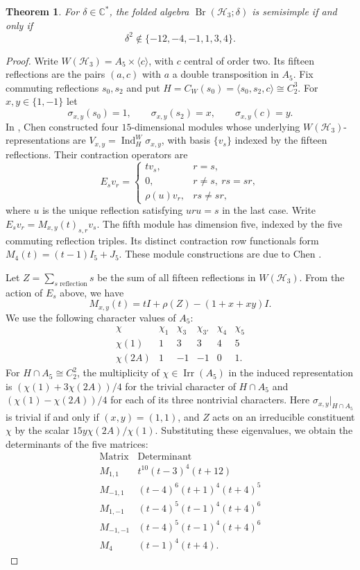 \documentclass[11pt,a4paper]{amsart}
\newcommand{\C}{\mathbb C}\newcommand{\Q}{\mathbb Q}\newcommand{\Z}{\mathbb Z}
\newcommand{\Br}{\operatorname{Br}}\newcommand{\Irr}{\operatorname{Irr}}
\newcommand{\Ind}{\operatorname{Ind}}\newcommand{\Res}{\operatorname{Res}}
\newtheorem{theorem}{Theorem}[section]
\theoremstyle{uprightdefinition}
\theoremstyle{remark}\newtheorem{remark}[theorem]{Remark}
\begin{document}
\begin{theorem}\label{thm:app-h3}
For $\delta\in\C^*$, the folded algebra $\Br(\mathscr{H}_3;\delta)$ is
semisimple if and only if
\[
 \delta^2\notin\{-12,-4,-1,1,3,4\}.
\]
\end{theorem}
\begin{proof}
Write $W(\mathscr{H}_3)=A_5\times\langle c\rangle$, with $c$ central of order
two. Its fifteen reflections are the pairs $(a,c)$ with $a$ a double
transposition in $A_5$. Fix commuting reflections $s_0,s_2$ and put
$H=C_W(s_0)=\langle s_0,s_2,c\rangle\cong C_2^3$.
For $x,y\in\{1,-1\}$ let
\[
 \sigma_{x,y}(s_0)=1,\qquad
 \sigma_{x,y}(s_2)=x,\qquad \sigma_{x,y}(c)=y.
\]
In \cite[Section~7]{Chen2012}, Chen constructed four $15$-dimensional modules whose underlying $W(\mathscr{H}_3)$-representations are
$V_{x,y}=\Ind_H^W\sigma_{x,y}$, with basis $\{v_s\}$
indexed by the fifteen reflections. Their contraction operators are
\[
 E_sv_r=\begin{cases}
 t v_s,&r=s,\\
 0,&r\ne s,\ rs=sr,\\
 \rho(u)v_r,&rs\ne sr,
 \end{cases}
\]
where $u$ is the unique reflection satisfying $uru=s$ in the last case.
Write $E_sv_r=M_{x,y}(t)_{s,r}v_s$.
The fifth module has dimension five, indexed by the five commuting
reflection triples. Its distinct contraction row functionals form
$M_4(t)=(t-1)I_5+J_5$.
These module constructions are due to Chen \cite[Section~7]{Chen2012}.

Let $Z=\sum_{s\text{ reflection}}s$ be the sum of all fifteen reflections in $W(\mathscr{H}_3)$. From the action of $E_s$ above, we have
\[
 M_{x,y}(t)=tI+\rho(Z)-(1+x+xy)I.
\]
We use the following character values of $A_5$:
\[
\begin{array}{c|rrrrr}
\chi&\chi_1&\chi_3&\chi_{3'}&\chi_4&\chi_5\\\hline
\chi(1)&1&3&3&4&5\\
\chi(2A)&1&-1&-1&0&1.
\end{array}
\]
For $H\cap A_5\cong C_2^2$, the multiplicity of $\chi\in\Irr(A_5)$ in the induced representation is
$(\chi(1)+3\chi(2A))/4$ for the trivial character of $H\cap A_5$ and
$(\chi(1)-\chi(2A))/4$ for each of its three nontrivial characters.
Here $\sigma_{x,y}|_{H\cap A_5}$ is trivial if and only if $(x,y)=(1,1)$,
and $Z$ acts on an irreducible constituent $\chi$ by the scalar
$15y\chi(2A)/\chi(1)$. Substituting these eigenvalues, we obtain the determinants of the five matrices:
\[
\begin{array}{c|l}
\text{Matrix}&\text{Determinant}\\\hline
M_{1,1}&t^{10}(t-3)^4(t+12)\\
M_{-1,1}&(t-4)^6(t+1)^4(t+4)^5\\
M_{1,-1}&(t-4)^5(t-1)^4(t+4)^6\\
M_{-1,-1}&(t-4)^5(t-1)^4(t+4)^6\\
M_4&(t-1)^4(t+4).
\end{array}
\]


\end{proof}
\end{document}
